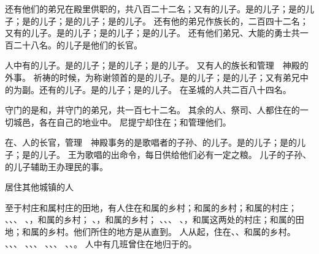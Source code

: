 {还有他们的弟兄在殿里供职的，共八百二十二名；又有{}的儿子{}。{}是{}的儿子；{}是{}的儿子；{}是{}的儿子；{}是{}的儿子；{}是{}的儿子。
还有他的弟兄作族长的，二百四十二名；又有{}的儿子{}。{}是{}的儿子；{}是{}的儿子；{}是{}的儿子。
还有他们弟兄、大能的勇士共一百二十八名。{}的儿子{}是他们的长官。
\par }{\PP {}人中有{}的儿子{}。{}是{}的儿子；{}是{}的儿子；{}是{}的儿子。
又有{}人的族长{}和{}管理　神殿的外事。
祈祷的时候，为称谢领首的是{}的儿子{}。{}是{}的儿子；{}是{}的儿子；又有{}弟兄中的{}为副。还有{}的儿子{}。{}是{}的儿子；{}是{}的儿子。
在圣城的{}人共二百八十四名。
\par }{\PP {}守门的是{}和{}，并守门的弟兄，共一百七十二名。
其余的{}人、祭司、{}人都住在{}的一切城邑，各在自己的地业中。
尼提宁却住在{}；{}和{}管理他们。
\par }{\PP {}在{}、{}人的长官，管理　神殿事务的是歌唱者{}的子孙、{}的儿子{}。{}是{}的儿子；{}是{}的儿子；{}是{}的儿子。
王为歌唱的出命令，每日供给他们必有一定之粮。
儿子{}的子孙、{}的儿子{}辅助王办理{}民的事。
\par }{\SH 居住其他城镇的人
\par }{\PP {}至于村庄和属村庄的田地，有{}人住在{}和属{}的乡村；{}和属{}的乡村；{}和属{}的村庄；
、{}、{}、
、{}，和属{}的乡村；
、{}，和属{}的乡村；
、{}、{}、
、{}，和属这两处的村庄；{}和属{}的田地；{}和属{}的乡村。他们所住的地方是从{}直到{}。
人从{}起，住在{}、{}、{}和属{}的乡村。
、{}、{}、
、{}、{}、
、{}、{}、
、{}、{}。
人中有几班曾住在{}地归于{}的。

}
